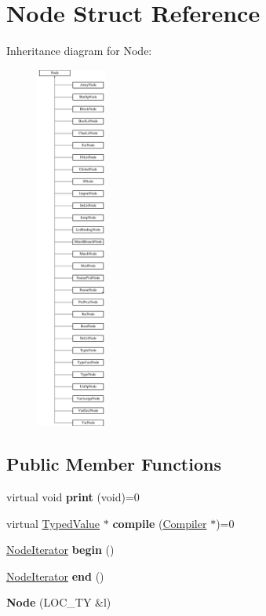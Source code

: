 \hypertarget{structNode}{}\section{Node Struct Reference}
\label{structNode}
Inheritance diagram for Node\+:\begin{figure}[H]
\begin{center}
\leavevmode
\includegraphics[height=12.000000cm]{structNode}
\end{center}
\end{figure}
\subsection*{Public Member Functions}
\begin{DoxyCompactItemize}
\item 
\mbox{\label{structNode_aa4de6ea3d3ed834945f1f19bcd7252b4}} 
virtual void {\bfseries print} (void)=0
\item 
\mbox{\label{structNode_ae2a9af0063bebb4530d35f4f44966bfa}} 
virtual \hyperlink{structTypedValue}{Typed\+Value} $\ast$ {\bfseries compile} (\hyperlink{structante_1_1Compiler}{Compiler} $\ast$)=0
\item 
\mbox{\label{structNode_af869c1880640503e7ce8b7f977d2e26e}} 
\hyperlink{structNodeIterator}{Node\+Iterator} {\bfseries begin} ()
\item 
\mbox{\label{structNode_a74e2abe32a0aab98338e46305533f79f}} 
\hyperlink{structNodeIterator}{Node\+Iterator} {\bfseries end} ()
\item 
\mbox{\label{structNode_af9f9dd5d2937a8f2e411f5244fd4d0dc}} 
{\bfseries Node} (L\+O\+C\+\_\+\+TY \&l)
\end{DoxyCompactItemize}
